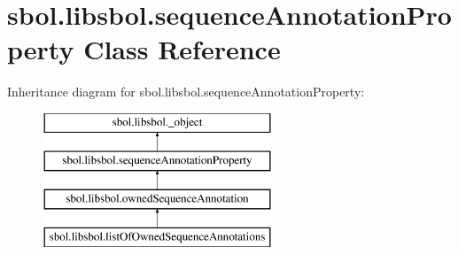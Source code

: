 \hypertarget{classsbol_1_1libsbol_1_1sequence_annotation_property}{}\section{sbol.\+libsbol.\+sequence\+Annotation\+Property Class Reference}
\label{classsbol_1_1libsbol_1_1sequence_annotation_property}
Inheritance diagram for sbol.\+libsbol.\+sequence\+Annotation\+Property\+:\begin{figure}[H]
\begin{center}
\leavevmode
\includegraphics[height=4.000000cm]{classsbol_1_1libsbol_1_1sequence_annotation_property}
\end{center}
\end{figure}
